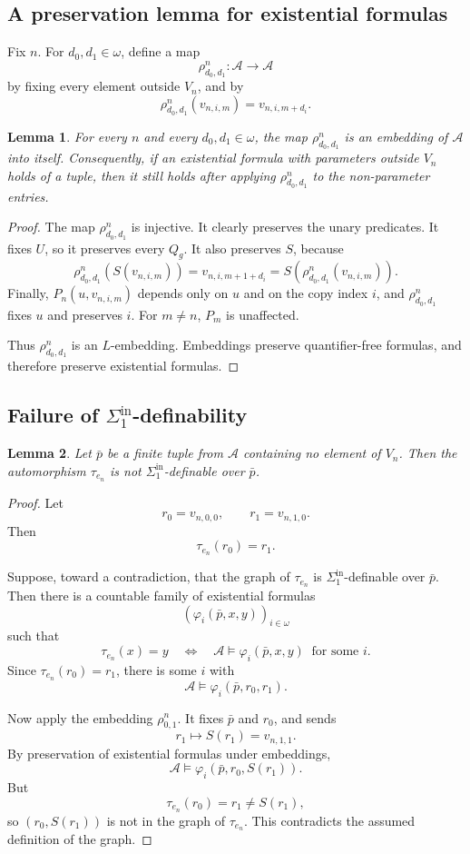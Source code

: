 \documentclass[12pt]{article}
\newtheorem{lemma}{Lemma}
\begin{document}
\subsection*{A preservation lemma for existential formulas}

Fix $n$.  For $d_0,d_1\in\omega$, define a map
\[
\rho^{n}_{d_0,d_1}:\mathcal A\to\mathcal A
\]
by fixing every element outside $V_n$, and by
\[
\rho^{n}_{d_0,d_1}(v_{n,i,m})=v_{n,i,m+d_i}.
\]

\begin{lemma}
For every $n$ and every $d_0,d_1\in\omega$, the map
$\rho^{n}_{d_0,d_1}$ is an embedding of $\mathcal A$ into itself.
Consequently, if an existential formula with parameters outside $V_n$
holds of a tuple, then it still holds after applying $\rho^{n}_{d_0,d_1}$
to the non-parameter entries.
\end{lemma}

\begin{proof}
The map $\rho^{n}_{d_0,d_1}$ is injective.  It clearly preserves the unary predicates.  It fixes $U$, so it preserves every $Q_g$.  It also preserves $S$, because
\[
\rho^{n}_{d_0,d_1}(S(v_{n,i,m}))
=
v_{n,i,m+1+d_i}
=
S(\rho^{n}_{d_0,d_1}(v_{n,i,m})).
\]
Finally, $P_n(u,v_{n,i,m})$ depends only on $u$ and on the copy index $i$, and $\rho^{n}_{d_0,d_1}$ fixes $u$ and preserves $i$.  For $m\neq n$, $P_m$ is unaffected.

Thus $\rho^{n}_{d_0,d_1}$ is an $L$-embedding.  Embeddings preserve quantifier-free formulas, and therefore preserve existential formulas.
\end{proof}

\subsection*{Failure of $\Sigma^{\mathrm{in}}_1$-definability}

\begin{lemma}
Let $\bar p$ be a finite tuple from $\mathcal A$ containing no element of
$V_n$.  Then the automorphism $\tau_{e_n}$ is not
$\Sigma^{\mathrm{in}}_1$-definable over $\bar p$.
\end{lemma}

\begin{proof}
Let
\[
r_0=v_{n,0,0},\qquad r_1=v_{n,1,0}.
\]
Then
\[
\tau_{e_n}(r_0)=r_1.
\]

Suppose, toward a contradiction, that the graph of $\tau_{e_n}$ is
$\Sigma^{\mathrm{in}}_1$-definable over $\bar p$.  Then there is a countable
family of existential formulas
\[
(\varphi_i(\bar p,x,y))_{i\in\omega}
\]
such that
\[
\tau_{e_n}(x)=y
\quad\Longleftrightarrow\quad
\mathcal A\models \varphi_i(\bar p,x,y)
\ \text{ for some }i.
\]
Since $\tau_{e_n}(r_0)=r_1$, there is some $i$ with
\[
\mathcal A\models \varphi_i(\bar p,r_0,r_1).
\]

Now apply the embedding $\rho^n_{0,1}$.  It fixes $\bar p$ and $r_0$, and sends
\[
r_1\mapsto S(r_1)=v_{n,1,1}.
\]
By preservation of existential formulas under embeddings,
\[
\mathcal A\models \varphi_i(\bar p,r_0,S(r_1)).
\]
But
\[
\tau_{e_n}(r_0)=r_1\neq S(r_1),
\]
so $(r_0,S(r_1))$ is not in the graph of $\tau_{e_n}$.  This contradicts the assumed definition of the graph.
\end{proof}
\end{document}
